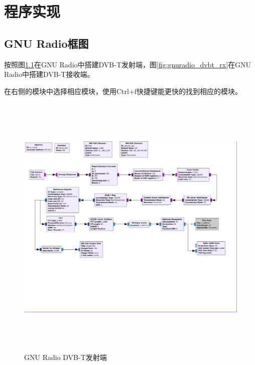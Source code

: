 \chapter{程序实现}
	\section{GNU Radio框图}
		\par 按照图\ref{fig:gnuradio_dvbt_tx}在GNU Radio中搭建DVB-T发射端，图\ref{fig:gnuradio_dvbt_rx}在GNU Radio中搭建DVB-T接收端。
		\par 在右侧的模块中选择相应模块，使用Ctrl+f快捷键能更快的找到相应的模块。
		\begin{figure}[htb]
			\centering
			\includegraphics[height=13cm,angle=-90]{figures/dvbt_tx.png}
			\caption{GNU Radio DVB-T发射端}
			\label{fig:gnuradio_dvbt_tx}
		\end{figure}
